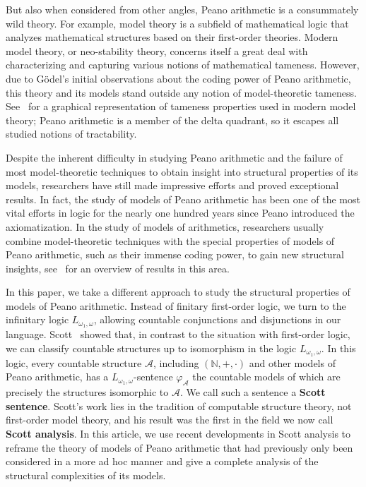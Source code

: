 \documentclass[11pt]{amsart}
\newcommand{\A}{\mathcal{A}}
\renewcommand{\phi}{\varphi}
\def\om{\omega}
\def\A{\mathcal A}
\def\Lomom{L_{\om_1,\om}}
\theoremstyle{remark}
\newcommand{\define}[1]{\textbf{#1}}
\begin{document}
But also when considered from other angles, Peano arithmetic is a consummately wild theory. For example, model theory is a subfield of mathematical logic that analyzes mathematical structures based on their first-order theories. Modern model theory, or neo-stability theory, concerns itself a great deal with characterizing and capturing various notions of mathematical tameness. However, due to G\"odel's initial observations about the coding power of Peano arithmetic, this theory and its models stand outside any notion of model-theoretic tameness. See~\cite{forkanddivide} for a graphical representation of tameness properties used in modern model theory; Peano arithmetic is a member of the delta quadrant, so it escapes all studied notions of tractability.


Despite the inherent difficulty in studying Peano arithmetic and the failure of most model-theoretic techniques to obtain insight into structural properties of its models, researchers have still made impressive efforts and proved exceptional results. In fact, the study of models of Peano arithmetic has been one of the most vital efforts in logic for the nearly one hundred years since Peano introduced the axiomatization. In the study of models of arithmetics, researchers usually combine model-theoretic techniques with the special properties of models of Peano arithmetic, such as their immense coding power, to gain new structural insights, see~ \cite{KS} for an overview of results in this area.

In this paper, we take a different approach to study the structural properties of models of Peano arithmetic. Instead of finitary first-order logic, we turn to the infinitary logic $\Lomom$, allowing countable conjunctions and disjunctions in our language. Scott~\cite{Sco65} showed that, in contrast to the situation with first-order logic, we can classify countable structures up to isomorphism in the logic $\Lomom$. In this logic, every countable structure $\A$, including $(\mathbb{N},+,\cdot)$ and other models of Peano arithmetic, has a $\Lomom$-sentence $\phi_\A$ the countable models of which are precisely the structures isomorphic to $\A$. We call such a sentence a \define{Scott sentence}.
Scott's work lies in the tradition of computable structure theory, not first-order model theory, and his result was the first in the field we now call \define{Scott analysis}.
In this article, we use recent developments in Scott analysis to reframe the theory of models of Peano arithmetic that had previously only been considered in a more ad hoc manner and give a complete analysis of the structural complexities of its models.
\end{document}
